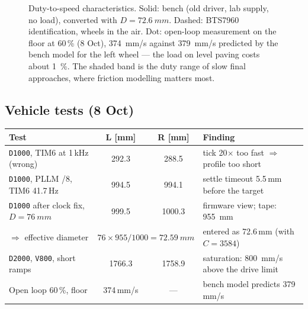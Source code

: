 \documentclass[11pt,a4paper]{article}
\newcommand{\code}[1]{\texttt{\small #1}}
\begin{document}
\begin{figure}[htbp]
\centering
{}
\caption{Duty-to-speed characteristics. Solid: bench (old driver, lab supply,
no load), converted with $D=\qty{72.6}{mm}$. Dashed: BTS7960 identification,
wheels in the air. Dot: open-loop measurement on the floor at 60\,\% (8 Oct),
\qty{374}{mm/s} against \qty{379}{mm/s} predicted by the bench model for the left
wheel --- the load on level paving costs about \qty{1}{\percent}. The shaded band
is the duty range of slow final approaches, where friction modelling matters most.}
\label{fig:kvplot}
\end{figure}

\subsection{Vehicle tests (8 Oct)}

\begin{center}
\small
\begin{tabularx}{\textwidth}{@{}lccL@{}}
\toprule
\textbf{Test} & \textbf{L [mm]} & \textbf{R [mm]} & \textbf{Finding}\\
\midrule
\code{D1000}, TIM6 at 1\,kHz (wrong) & 292.3 & 288.5 & tick 20$\times$ too fast $\Rightarrow$ profile too short\\
\code{D1000}, PLLM /8, TIM6 41.7\,Hz & 994.5 & 994.1 & settle timeout 5.5\,mm before the target\\
\code{D1000} after clock fix, $D=\qty{76}{mm}$ & 999.5 & 1000.3 & firmware view; tape: \qty{955}{mm}\\
$\Rightarrow$ effective diameter &  & entered as 72.6\,mm (with $C=3584$)\\
\code{D2000}, \code{V800}, short ramps & 1766.3 & 1758.9 & saturation: \qty{800}{mm/s} above the drive limit\\
Open loop 60\,\%, floor & 374\,mm/s & --- & bench model predicts 379\,mm/s\\
\bottomrule
\end{tabularx}
\end{center}
\end{document}
